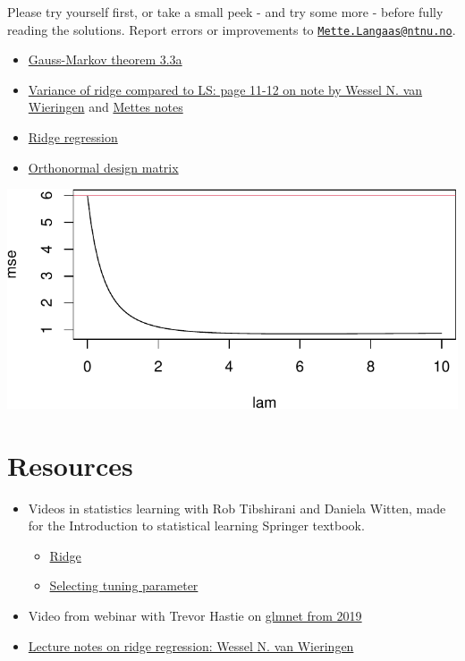 \documentclass[
  letterpaper,
  DIV=11,
  numbers=noendperiod]{scrartcl}
\providecommand{\tightlist}{%
  \setlength{\itemsep}{0pt}\setlength{\parskip}{0pt}}\usepackage{longtable,booktabs,array}
\begin{document}
Please try yourself first, or take a small peek - and try some more -
before fully reading the solutions. Report errors or improvements to
\href{mailto:Mette.Langaas@ntnu.no}{\nolinkurl{Mette.Langaas@ntnu.no}}.

\begin{itemize}
\item
  \href{./ESLe33a.pdf}{Gauss-Markov theorem 3.3a}
\item
  \href{https://arxiv.org/pdf/1509.09169.pdf}{Variance of ridge compared
  to LS: page 11-12 on note by Wessel N. van Wieringen} and
  \href{./LSvsRRvar.pdf}{Mettes notes}
\item
  \href{./L2exRR1.pdf}{Ridge regression}
\item
  \href{./L7ExRidgeOrth.pdf}{Orthonormal design matrix}
\end{itemize}

\includegraphics{L7_files/figure-pdf/unnamed-chunk-17-1.pdf}

\hypertarget{resources}{%
\section{Resources}\label{resources}}

\begin{itemize}
\item
  Videos in statistics learning with Rob Tibshirani and Daniela Witten,
  made for the Introduction to statistical learning Springer textbook.

  \begin{itemize}
  \tightlist
  \item
    \href{https://www.youtube.com/watch?v=cSKzqb0EKS0}{Ridge}
  \item
    \href{https://www.youtube.com/watch?v=xMKVUstjXBE}{Selecting tuning
    parameter}
  \end{itemize}
\item
  Video from webinar with Trevor Hastie on
  \href{http://youtu.be/BU2gjoLPfDc}{glmnet from 2019}
\item
  \href{https://arxiv.org/pdf/1509.09169v7.pdf}{Lecture notes on ridge
  regression: Wessel N. van Wieringen}
\end{itemize}
\end{document}
